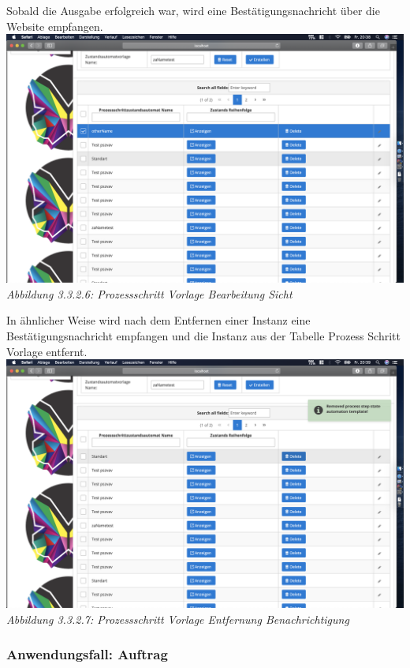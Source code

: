 \documentclass[enabledeprecatedfontcommands,fontsize=12pt,paper=a4,twoside]{scrartcl}
\begin{document}
Sobald die Ausgabe erfolgreich war, wird eine Bestätigungsnachricht über die Website empfangen.\\

\hypertarget{sc3.3.3.6}{
\includegraphics[width=1\textwidth]{Screenshots/333EditErfolg.png}
\textit{Abbildung 3.3.2.6:  Prozessschritt Vorlage Bearbeitung Sicht}
} 

In ähnlicher Weise wird nach dem Entfernen einer Instanz eine Bestätigungsnachricht empfangen und die Instanz aus der Tabelle Prozess Schritt Vorlage entfernt.\\

\hypertarget{sc3.3.3.7}{
\includegraphics[width=1\textwidth]{Screenshots/333removemesage.png}
\textit{Abbildung 3.3.2.7: Prozessschritt Vorlage Entfernung Benachrichtigung}
} 


\subsubsection{Anwendungsfall: Auftrag}
\end{document}
